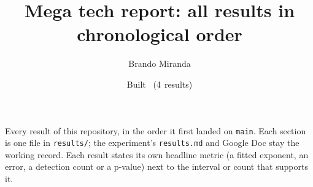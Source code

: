 \documentclass[11pt]{article}
\title{Mega tech report: all results in chronological order}
\author{Brando Miranda}
\date{Built \MegaBuilt\ ($4$ results)}
\begin{document}
\maketitle
\noindent Every result of this repository, in the order it first landed on \texttt{main}. Each section is one file in
\texttt{results/}; the experiment's \texttt{results.md} and Google Doc stay the working record. Each result states its own
headline metric (a fitted exponent, an error, a detection count or a p-value) next to the interval or count that supports it.
\bigskip

\end{document}
